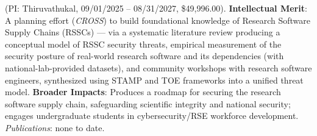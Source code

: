  (PI: Thiruvathukal, 09/01/2025 -- 08/31/2027, \$49,996.00).
\textbf{Intellectual Merit}: A planning effort (\emph{CROSS}) to build foundational knowledge of Research Software Supply Chains (RSSCs) --- via a systematic literature review producing a conceptual model of RSSC security threats, empirical measurement of the security posture of real-world research software and its dependencies (with national-lab-provided datasets), and community workshops with research software engineers, synthesized using STAMP and TOE frameworks into a unified threat model.
\textbf{Broader Impacts}: Produces a roadmap for securing the research software supply chain, safeguarding scientific integrity and national security; engages undergraduate students in cybersecurity/RSE workforce development.
\emph{Publications}: none to date.
